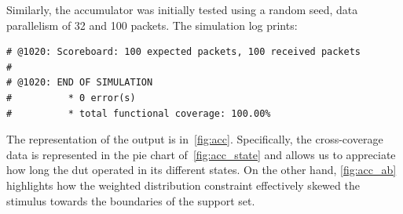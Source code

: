  Similarly, the accumulator was initially tested using a random seed, data parallelism of \qty{32}{\bit} and \num{100} packets. The simulation log prints:
\begin{verbatim}
# @1020: Scoreboard: 100 expected packets, 100 received packets
# 
# @1020: END OF SIMULATION
#          * 0 error(s)
#          * total functional coverage: 100.00%
\end{verbatim}
The representation of the output is in~\cref{fig:acc}. Specifically, the cross-coverage data is represented in the pie chart of~\cref{fig:acc_state} and allows us to appreciate how long the \ac{dut} operated in its different states. On the other hand, \cref{fig:acc_ab} highlights how the weighted distribution constraint effectively skewed the stimulus towards the boundaries of the support set.